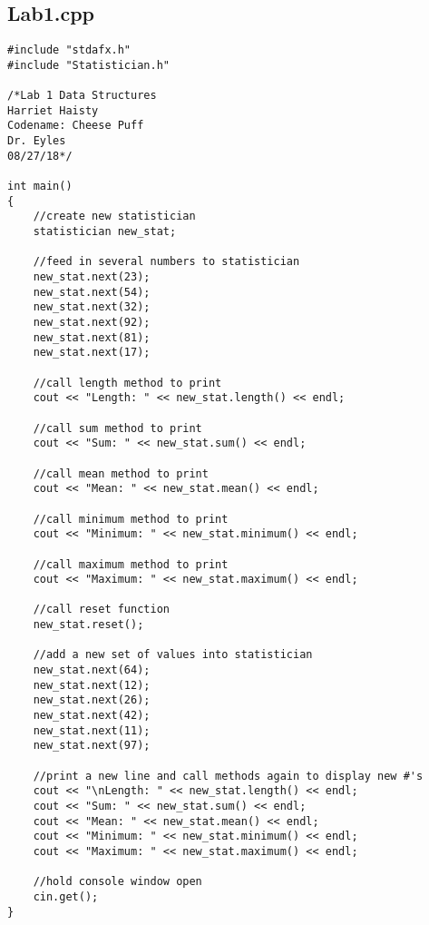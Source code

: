 \documentclass[11pt]{article}
\begin{document}
\subsection*{Lab1.cpp}
\begin{lstlisting}
#include "stdafx.h"
#include "Statistician.h"

/*Lab 1 Data Structures
Harriet Haisty
Codename: Cheese Puff
Dr. Eyles
08/27/18*/

int main()
{
	//create new statistician
	statistician new_stat;
	
	//feed in several numbers to statistician
	new_stat.next(23);
	new_stat.next(54);
	new_stat.next(32);
	new_stat.next(92);
	new_stat.next(81);
	new_stat.next(17);

	//call length method to print
	cout << "Length: " << new_stat.length() << endl;

	//call sum method to print
	cout << "Sum: " << new_stat.sum() << endl;

	//call mean method to print
	cout << "Mean: " << new_stat.mean() << endl;

	//call minimum method to print
	cout << "Minimum: " << new_stat.minimum() << endl;

	//call maximum method to print
	cout << "Maximum: " << new_stat.maximum() << endl;

	//call reset function
	new_stat.reset();

	//add a new set of values into statistician
	new_stat.next(64);
	new_stat.next(12);
	new_stat.next(26);
	new_stat.next(42);
	new_stat.next(11);
	new_stat.next(97);

	//print a new line and call methods again to display new #'s
	cout << "\nLength: " << new_stat.length() << endl;
	cout << "Sum: " << new_stat.sum() << endl;
	cout << "Mean: " << new_stat.mean() << endl;
	cout << "Minimum: " << new_stat.minimum() << endl;
	cout << "Maximum: " << new_stat.maximum() << endl;

	//hold console window open
	cin.get();
}
\end{lstlisting}
\end{document}
